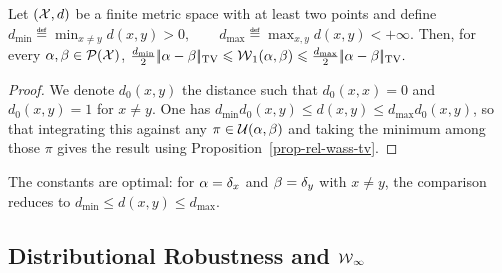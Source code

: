 \begin{prop}
Let $(\mathcal{X},d)$ be a finite metric space with at least two points and define
\(d_{\min} \eqdef \min_{x\neq y}d(x,y)>0, \qquad d_{\max} \eqdef \max_{x,y}d(x,y)<+\infty.\)
Then, for every $\alpha,\beta\in\mathcal{P}(\mathcal{X})$, \(\frac{d_{\min}}{2}|\!| \alpha-\beta |\!|_{\operatorname{TV}} \leqslant \operatorname{\mathcal{W}}_1(\alpha,\beta) \leqslant \frac{d_{\max}}{2}|\!| \alpha-\beta |\!|_{\operatorname{TV}}.\)
\end{prop}
\begin{proof}
We denote $d_0(x,y)$ the distance such that $d_0(x,x)=0$ and $d_0(x,y)=1$ for $x \neq y$. One has
\(d_{\min} d_0(x,y) \leq d(x,y) \leq d_{\max} d_0(x,y)\),
so that integrating this against any $\pi \in \mathcal{U}(\alpha,\beta)$ and taking the minimum among those $\pi$ gives the result using Proposition~\ref{prop-rel-wass-tv}.
\end{proof}
The constants are optimal: for $\alpha=\delta_x$ and $\beta=\delta_y$ with $x\neq y$, the comparison reduces to
\(d_{\min} \leq d(x,y) \leq d_{\max}.\)
\subsection{Distributional Robustness and \texorpdfstring{$\operatorname{\mathcal{W}}_\infty$}{W-infinity}}
\label{sec-dro-wasserstein-infinity}
